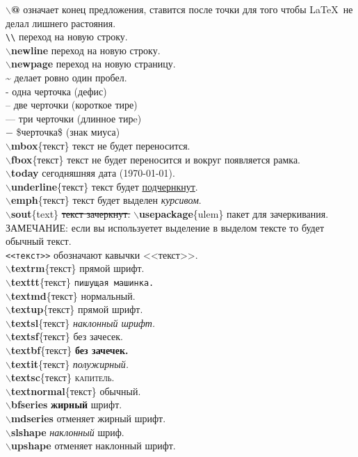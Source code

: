 \documentclass{article}
\newcommand{\bs}{$\backslash$}
\newcommand{\bd}[1]{{\bfseries #1}} %
\newcommand{\bb}[1]{\bd{\bs #1}} %
\begin{document}
\bb{@} означает конец предложения, ставится после точки для того чтобы
\LaTeX~не делал лишнего растояния.\\
\verb|\\| переход на новую строку.\\
\bb{newline} переход на новую строку.\\
\bb{newpage} переход на новую страницу.\\
\~{} делает ровно один пробел.\\
- одна черточка (дефис)\\
-- две черточки (короткое тире)\\
--- три черточки (длинное тирe)\\
$-$ \$черточка\$ (знак миуса)\\
\bb{mbox}\{текст\} текст не будет переносится.\\
\bb{fbox}\{текст\} текст не будет переносится и вокруг появляется рамка.\\
\bb{today} сегодняшняя дата (\today).\\
\bb{underline}\{текст\} текст будет \underline{подчернкнут}.\\
\bb{emph}\{текст\} текст будет выделен \emph{курсивом}.\\
\bb{sout}\{text\} \sout{текст зачеркнут.}
\bb{usepackage}\{ulem\} пакет для зачеркивания.\\
ЗАМЕЧАНИЕ: если вы используетет выделение в выделом тексте
то будет обычный текст.\\
\verb|<<текст>>| обозначают кавычки <<текст>>.\\

\bb{textrm}\{текст\} \textrm{прямой шрифт}.\\
\bb{texttt}\{текст\} \texttt{пишущая машинка.}\\
\bb{textmd}\{текст\} \textmd{нормальный.}\\
\bb{textup}\{текст\} \textup{прямой шрифт.}\\
\bb{textsl}\{текст\} \textsl{наклонный шрифт.}\\
\bb{textsf}\{текст\} \textsf{без зачесек.}\\
\bb{textbf}\{текст\} \textbf{без зачечек.}\\
\bb{textit}\{текст\} \textit{полужирный.}\\
\bb{textsc}\{текст\} \textsc{капитель.}\\
\bb{textnormal}\{текст\} \textnormal{обычный.}\\
\bb{bfseries} {\bfseries жирный} шрифт.\\
\bb{mdseries} отменяет жирный шрифт.\\
\bb{slshape} {\slshape наклонный} шриф.\\
\bb{upshape} отменяет наклонный шрифт.\\
\end{document}
